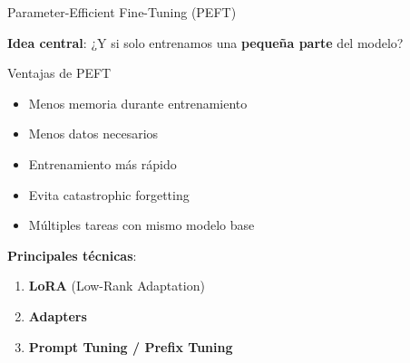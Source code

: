 \begin{frame}{Parameter-Efficient Fine-Tuning (PEFT)}

\textbf{Idea central}: ¿Y si solo entrenamos una \textbf{pequeña parte} del modelo?

\vspace{0.5em}

\begin{block}{Ventajas de PEFT}
\begin{itemize}
    \item Menos memoria durante entrenamiento
    \item Menos datos necesarios
    \item Entrenamiento más rápido
    \item Evita catastrophic forgetting
    \item Múltiples tareas con mismo modelo base
\end{itemize}
\end{block}

\vspace{0.5em}

\textbf{Principales técnicas}:
\begin{enumerate}
    \item \textbf{LoRA} (Low-Rank Adaptation)
    \item \textbf{Adapters}
    \item \textbf{Prompt Tuning / Prefix Tuning}
\end{enumerate}

\end{frame}

